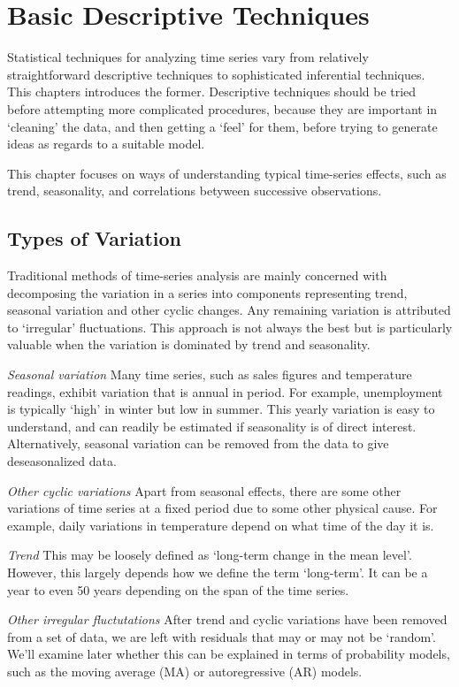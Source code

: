 \section{Basic Descriptive Techniques}

Statistical techniques for analyzing time series vary from relatively straightforward descriptive techniques to sophisticated inferential techniques. This chapters introduces the former. Descriptive techniques should be tried before attempting more complicated procedures, because they are important in `cleaning' the data, and then getting a `feel' for them, before trying to generate ideas as regards to a suitable model.

This chapter focuses on ways of understanding typical time-series effects, such as trend, seasonality, and correlations betyween successive observations.



\subsection{Types of Variation}
Traditional methods of time-series analysis are mainly concerned with decomposing the variation in a series into components representing trend, seasonal variation and other cyclic changes. Any remaining variation is attributed to `irregular' fluctuations. This approach is not always the best but is particularly valuable when the variation is dominated by trend and seasonality. 

\textit{Seasonal variation}
Many time series, such as sales figures and temperature readings, exhibit variation that is annual in period. For example, unemployment is typically `high' in winter but low in summer. This yearly variation is easy to understand, and can readily be estimated if seasonality is of direct interest. Alternatively, seasonal variation can be removed from the data to give deseasonalized data.

\textit{Other cyclic variations}
Apart from seasonal effects, there are some other variations of time series at a fixed period due to some other physical cause. For example, daily variations in temperature depend on what time of the day it is. 

\textit{Trend}
This may be loosely defined as `long-term change in the mean level'. However, this largely depends how we define the term `long-term'. It can be a year to even 50 years depending on the span of the time series.

\textit{Other irregular fluctutations}
After trend and cyclic variations have been removed from a set of data, we are left with residuals that may or may not be `random'. We'll examine later whether this can be explained in terms of probability models, such as the moving average (MA) or autoregressive (AR) models.



